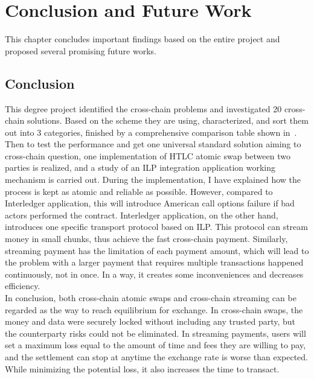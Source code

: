\chapter{Conclusion and Future Work}
\label{chap:5}
\noindent This chapter concludes important findings based on the entire project and proposed several promising future works.
\section{Conclusion}
\label{sec:conclusion}
\noindent This degree project identified the cross-chain problems and investigated 20 cross-chain solutions. Based on the scheme they are using, characterized, and sort them out into 3 categories, finished by a comprehensive comparison table shown in~. \\

\noindent Then to test the performance and get one universal standard solution aiming to cross-chain question, one implementation of HTLC atomic swap between two parties is realized, and a study of an ILP integration application working mechanism is carried out. During the implementation, I have explained how the process is kept as atomic and reliable as possible. However, compared to Interledger application, this will introduce American call options failure if bad actors performed the contract. Interledger application, on the other hand, introduces one specific transport protocol based on ILP. This protocol can stream money in small chunks, thus achieve the fast cross-chain payment. Similarly, streaming payment has the limitation of each payment amount, which will lead to the problem with a larger payment that requires multiple transactions happened continuously, not in once. In a way, it creates some inconveniences and decreases efficiency.  \\

\noindent  In conclusion, both cross-chain atomic swaps and cross-chain streaming can be regarded as the way to reach equilibrium for exchange. In cross-chain swaps, the money and data were securely locked without including any trusted party, but the counterparty risks could not be eliminated. In streaming payments, users will set a maximum loss equal to the amount of time and fees they are willing to pay, and the settlement can stop at anytime the exchange rate is worse than expected. While minimizing the potential loss, it also increases the time to transact. \\

